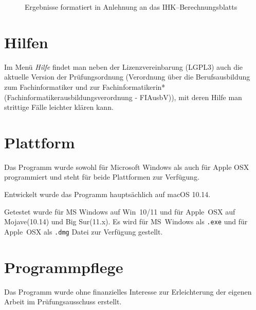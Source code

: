 \documentclass[a4paper,notitlepage,parskip=half]{scrartcl}
\begin{document}
\begin{figure}[ht]
  \centering
  \caption{Ergebnisse formatiert in Anlehnung an das IHK--Berechnungsblatts}
  \label{fig:ihkausgabeblatt}
\end{figure}

\section{Hilfen}
Im Menü \emph{Hilfe} findet man neben der Lizenzvereinbarung (LGPL3) auch die aktuelle Version der Prüfungsordnung
(Verordnung über die Berufsausbildung zum Fachinformatiker und zur Fachinformatikerin* (Fachinformatikerausbildungsverordnung - FIAusbV)), mit deren Hilfe man strittige Fälle leichter klären kann.

\section{Plattform}
Das Programm wurde sowohl für Microsoft Windows als auch für Apple OSX programmiert und steht für beide Plattformen zur Verfügung. 

Entwickelt wurde das Programm hauptsächlich auf macOS 10.14.

Getestet  wurde für MS Windows auf Win~10/11 und für Apple~OSX auf Mojave(10.14) und Big Sur(11.x).
Es wird für MS~Windows als \texttt{.exe} und für Apple~OSX als \texttt{.dmg} Datei zur Verfügung gestellt. 

\section{Programmpflege}
Das Programm wurde ohne finanzielles Interesse zur Erleichterung der eigenen Arbeit im Prüfungsausschuss erstellt.
\end{document}
